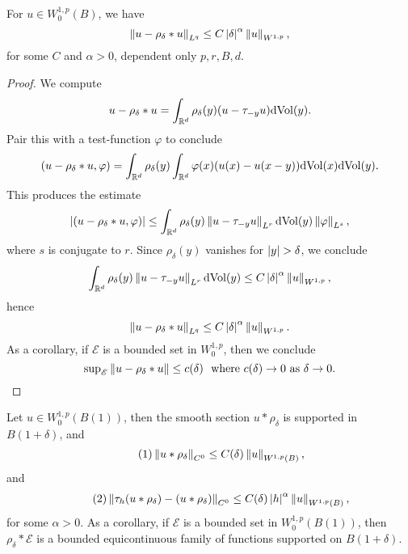 \documentclass{amsart}
\begin{document}
\begin{lemma}
  For $u\in W^{1,p}_{0}(B)$, we have
  \begin{equation*}
    \left\lVert u-\rho_{\delta}\ast u\right\rVert_{L^{q}}\le C\left|\delta\right|^{\alpha}\left\lVert u\right\rVert_{W^{1,p}},    
  \end{equation*}
  for some $C$ and $\alpha>0$, dependent only $p,r,B,d$.
\end{lemma}

\begin{proof}
  We compute
  \begin{equation*}
    u-\rho_{\delta}\ast u=\int_{\mathbb{R}^{d}}\rho_{\delta}(y) (u-\tau_{-y}u)\mathrm{dVol}(y).
  \end{equation*}
  Pair this with a test-function $\varphi$ to conclude
  \begin{equation*}
    (u-\rho_{\delta}\ast u,\varphi)=\int_{\mathbb{R}^{d}}\rho_{\delta}(y)\int_{\mathbb{R}^{d}}\varphi(x)(u(x)-u(x-y))\mathrm{d}\mathrm{Vol}(x)\mathrm{d}\mathrm{Vol}(y).
  \end{equation*}
  This produces the estimate
  \begin{equation*}
    \left|(u-\rho_{\delta}\ast u,\varphi)\right|\le \int_{\mathbb{R}^{d}}\rho_{\delta}(y)\left\lVert u-\tau_{-y}u\right\rVert_{L^{r}}\mathrm{dVol}(y)\left\lVert\varphi\right\rVert_{L^{s}},
  \end{equation*}
  where $s$ is conjugate to $r$. Since $\rho_{\delta}(y)$ vanishes for $\abs{y}>\delta$, we conclude
  \begin{equation*}
    \int_{\mathbb{R}^{d}}\rho_{\delta}(y)\left\lVert u-\tau_{-y}u\right\rVert_{L^{r}}\mathrm{dVol}(y)\le C\left|\delta\right|^{\alpha}\left\lVert u\right\rVert_{W^{1,p}},    
  \end{equation*}
  hence
  \begin{equation*}
    \left\lVert u-\rho_{\delta}\ast u\right\rVert_{L^{q}}\le C\left|\delta\right|^{\alpha}\left\lVert u\right\rVert_{W^{1,p}}.
  \end{equation*}
  As a corollary, if $\mathscr{E}$ is a bounded set in $W^{1,p}_{0}$, then we conclude
  \begin{equation*}
    \text{sup}_{\mathscr{E}}\left\lVert u-\rho_{\delta}\ast u\right\rVert\le c(\delta)\ \ \text{where $c(\delta)\to 0$ as $\delta\to 0$.}
  \end{equation*}
\end{proof}
\begin{lemma}
  Let $u\in W^{1,p}_{0}(B(1))$, then the smooth section $u\ast \rho_{\delta}$ is supported in $B(1+\delta)$, and 
  \begin{equation*}\tag{$1$}
    \left\lVert u\ast \rho_{\delta}\right\rVert_{C^{0}}\le C(\delta)\left\lVert u\right\rVert_{W^{1,p}(B)},
  \end{equation*}
  and 
  \begin{equation*}\tag{$2$}
    \left\lVert\tau_{h}(u\ast \rho_{\delta})-(u\ast \rho_{\delta})\right\rVert_{C^{0}}\le C(\delta) \left|h\right|^{\alpha}\left\lVert u\right\rVert_{W^{1,p}(B)},
  \end{equation*}
  for some $\alpha>0$. As a corollary, if $\mathscr{E}$ is a bounded set in $W^{1,p}_{0}(B(1))$, then $\rho_{\delta}\ast \mathscr{E}$ is a bounded equicontinuous family of functions supported on $B(1+\delta)$.
\end{lemma}
\end{document}
